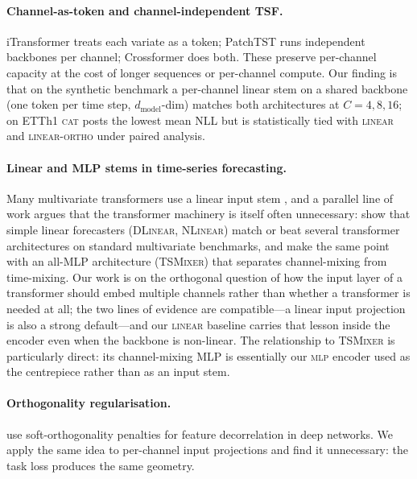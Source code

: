 \documentclass[11pt]{article}
\begin{document}
\paragraph{Channel-as-token and channel-independent TSF.}
iTransformer \citep{liu2024itransformer} treats each variate as a
token; PatchTST \citep{nie2023patchtst} runs independent backbones
per channel; Crossformer \citep{zhang2023crossformer} does both.
These preserve per-channel capacity at the cost of longer sequences
or per-channel compute. Our finding is that on the synthetic
benchmark a per-channel linear stem on a shared backbone (one
token per time step, $d_{\text{model}}$-dim) matches both
architectures at $C{=}4, 8, 16$; on ETTh1 \textsc{cat} posts the
lowest mean NLL but is statistically tied with \textsc{linear} and
\textsc{linear-ortho} under paired analysis.

\paragraph{Linear and MLP stems in time-series forecasting.}
Many multivariate transformers use a linear input stem
\citep{zhou2021informer,wu2023timesnet}, and a parallel line of
work argues that the transformer machinery is itself often
unnecessary: \citet{zeng2023transformers} show that simple linear
forecasters (\textsc{DLinear}, \textsc{NLinear}) match or beat
several transformer architectures on standard multivariate
benchmarks, and \citet{chen2023tsmixer} make the same point with
an all-MLP architecture (\textsc{TSMixer}) that separates
channel-mixing from time-mixing. Our work is on the orthogonal
question of how the input layer of a transformer should embed
multiple channels rather than whether a transformer is needed at
all; the two lines of evidence are compatible---a linear input
projection is also a strong default---and our \textsc{linear}
baseline carries that lesson inside the encoder even when the
backbone is non-linear. The relationship to \textsc{TSMixer} is
particularly direct: its channel-mixing MLP is essentially our
\textsc{mlp} encoder used as the centrepiece rather than as an
input stem.

\paragraph{Orthogonality regularisation.}
\citet{bansal2018gainsorthogonality} use soft-orthogonality
penalties for feature decorrelation in deep networks. We apply the
same idea to per-channel input projections and find it
unnecessary: the task loss produces the same geometry.
\end{document}
